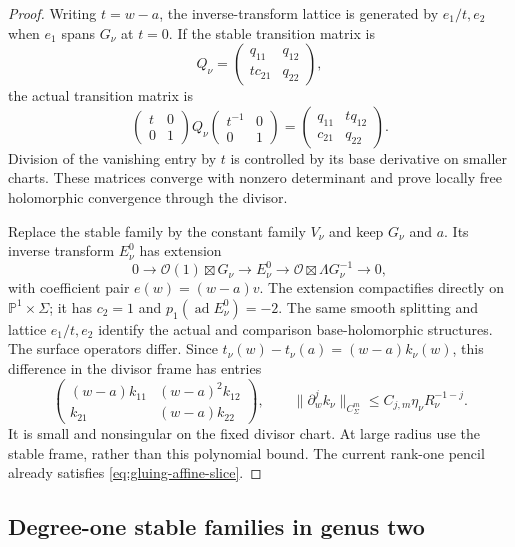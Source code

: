 \documentclass[11pt]{amsart}
\theoremstyle{definition}
\theoremstyle{remark}
\theoremstyle{plain}
\newcommand{\PP}{\mathbb{P}}
\newcommand{\ad}{\operatorname{ad}}
\begin{document}
\begin{proof}
Writing $t=w-a$, the inverse-transform lattice is generated by
$e_1/t,e_2$ when $e_1$ spans $G_\nu$ at $t=0$. If the stable
transition matrix is
\[
 Q_\nu=\begin{pmatrix}q_{11}&q_{12}\\tc_{21}&q_{22}\end{pmatrix},
\]
the actual transition matrix is
\begin{equation}\label{eq:converse-modification-transitions}
 \begin{pmatrix}t&0\\0&1\end{pmatrix}Q_\nu
 \begin{pmatrix}t^{-1}&0\\0&1\end{pmatrix}
 =\begin{pmatrix}q_{11}&tq_{12}\\c_{21}&q_{22}\end{pmatrix}.
\end{equation}
Division of the vanishing entry by $t$ is controlled by its
base derivative on smaller charts. These matrices converge with
nonzero determinant and prove locally free holomorphic convergence
through the divisor.

Replace the stable family by the constant family $V_\nu$ and keep
$G_\nu$ and $a$. Its inverse transform $E_\nu^0$ has extension
\[
 0\longrightarrow\mathcal O(1)\boxtimes G_\nu
 \longrightarrow E_\nu^0
 \longrightarrow\mathcal O\boxtimes\Lambda G_\nu^{-1}
 \longrightarrow0,
\]
with coefficient pair $e(w)=(w-a)v$. The extension compactifies
directly on $\PP^1\times\Sigma$; it has $c_2=1$ and
$p_1(\ad E_\nu^0)=-2$. The same smooth splitting and lattice
$e_1/t,e_2$ identify the actual and comparison base-holomorphic
structures. The surface operators differ. Since
$t_\nu(w)-t_\nu(a)=(w-a)k_\nu(w)$, this difference in the divisor
frame has entries
\[
 \begin{pmatrix}
 (w-a)k_{11}&(w-a)^2k_{12}\\
 k_{21}&(w-a)k_{22}
 \end{pmatrix},\qquad
 \|\partial_w^jk_\nu\|_{C^m_\Sigma}
             \leq C_{j,m}\eta_\nu R_\nu^{-1-j}.
\]
It is small and nonsingular on the fixed divisor chart. At large
radius use the stable frame, rather than this polynomial bound.
The current rank-one pencil already satisfies
\eqref{eq:gluing-affine-slice}.
\end{proof}

\subsection{Degree-one stable families in genus two}
\end{document}
